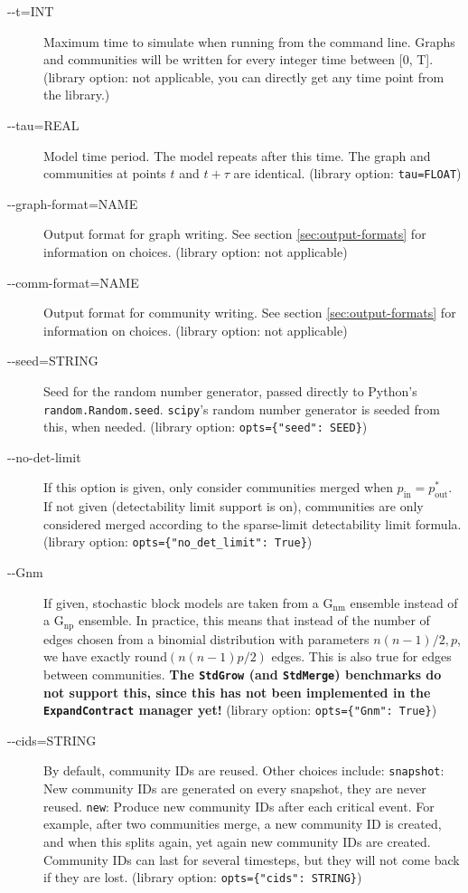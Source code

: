 \documentclass{article}
\def\pin{p_\mathrm{in}}
\def\pout{p_\mathrm{out}}
\def\code#1{\texttt{#1}}
\begin{document}
\begin{description}
\item[-{}-t=INT] Maximum time to simulate when running from the command
  line.  Graphs and communities will be written for every integer time
  between [0, T].  (library option: not applicable, you can directly
  get any time point from the library.)
\item[-{}-tau=REAL] Model time period.  The model repeats after this
  time.  The graph and communities at points $t$ and $t+\tau$ are
  identical.  (library option: \code{tau=FLOAT})
\item [-{}-graph-format=NAME] Output format for graph writing.  See
  section \ref{sec:output-formats} for information on choices.
  (library option: not applicable)
\item [-{}-comm-format=NAME] Output format for community writing.  See
  section \ref{sec:output-formats} for information on choices.
  (library option: not applicable)
\item [-{}-seed=STRING] Seed for the random number generator, passed
  directly to Python's \code{random.Random.seed}.  \texttt{scipy}'s
  random number generator is seeded from this, when needed.  (library
  option: \texttt{opts=\{"seed": SEED\}})
\item [-{}-no-det-limit] If this option is given, only consider
  communities merged when $\pin=\pout^*$.  If not given (detectability
  limit support is on), communities are only considered merged
  according to the sparse-limit detectability limit formula.  (library
  option: \texttt{opts=\{"no\_det\_limit": True\}})
\item [-{}-Gnm] If given, stochastic block models are taken from a
  G$_\mathrm{nm}$ ensemble instead of a G$_\mathrm{np}$ ensemble.  In
  practice, this means that instead of the number of edges chosen from
  a binomial distribution with parameters $n(n-1)/2, p$, we have
  exactly $\textrm{round}(n(n-1)p/2)$ edges.  This is also true for
  edges between communities.  \textbf{The \texttt{StdGrow} (and
    \texttt{StdMerge}) benchmarks do not support this, since this has
    not been implemented in the \texttt{ExpandContract} manager
    yet!} (library option: \texttt{opts=\{"Gnm": True\}})
\item[-{}-cids=STRING] By default, community IDs are reused.  Other
  choices include: \texttt{snapshot}: New community IDs are generated
  on every snapshot, they are never reused.  \texttt{new}: Produce new
  community IDs after each critical event.  For example, after two
  communities merge, a new community ID is created, and when this
  splits again, yet again new community IDs are created.  Community
  IDs can last for several timesteps, but they will not come back if
  they are lost.  (library option: \texttt{opts=\{"cids": STRING\}})
\end{description}
\end{document}
